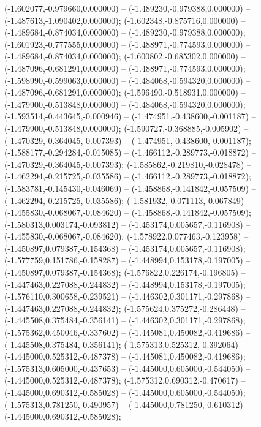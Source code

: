  (-1.602077,-0.979660,0.000000) -- (-1.489230,-0.979388,0.000000) -- (-1.487613,-1.090402,0.000000);
 (-1.602348,-0.875716,0.000000) -- (-1.489684,-0.874034,0.000000) -- (-1.489230,-0.979388,0.000000);
 (-1.601923,-0.777555,0.000000) -- (-1.488971,-0.774593,0.000000) -- (-1.489684,-0.874034,0.000000);
 (-1.600802,-0.685302,0.000000) -- (-1.487096,-0.681291,0.000000) -- (-1.488971,-0.774593,0.000000);
 (-1.598990,-0.599063,0.000000) -- (-1.484068,-0.594320,0.000000) -- (-1.487096,-0.681291,0.000000);
 (-1.596490,-0.518931,0.000000) -- (-1.479900,-0.513848,0.000000) -- (-1.484068,-0.594320,0.000000);
 (-1.593514,-0.443645,-0.000946) -- (-1.474951,-0.438600,-0.001187) -- (-1.479900,-0.513848,0.000000);
 (-1.590727,-0.368885,-0.005902) -- (-1.470329,-0.364045,-0.007393) -- (-1.474951,-0.438600,-0.001187);
 (-1.588177,-0.294284,-0.015085) -- (-1.466112,-0.289773,-0.018872) -- (-1.470329,-0.364045,-0.007393);
 (-1.585862,-0.219810,-0.028478) -- (-1.462294,-0.215725,-0.035586) -- (-1.466112,-0.289773,-0.018872);
 (-1.583781,-0.145430,-0.046069) -- (-1.458868,-0.141842,-0.057509) -- (-1.462294,-0.215725,-0.035586);
 (-1.581932,-0.071113,-0.067849) -- (-1.455830,-0.068067,-0.084620) -- (-1.458868,-0.141842,-0.057509);
 (-1.580313,0.003174,-0.093812) -- (-1.453174,0.005657,-0.116908) -- (-1.455830,-0.068067,-0.084620);
 (-1.578922,0.077463,-0.123958) -- (-1.450897,0.079387,-0.154368) -- (-1.453174,0.005657,-0.116908);
 (-1.577759,0.151786,-0.158287) -- (-1.448994,0.153178,-0.197005) -- (-1.450897,0.079387,-0.154368);
 (-1.576822,0.226174,-0.196805) -- (-1.447463,0.227088,-0.244832) -- (-1.448994,0.153178,-0.197005);
 (-1.576110,0.300658,-0.239521) -- (-1.446302,0.301171,-0.297868) -- (-1.447463,0.227088,-0.244832);
 (-1.575624,0.375272,-0.286448) -- (-1.445508,0.375484,-0.356141) -- (-1.446302,0.301171,-0.297868);
 (-1.575362,0.450046,-0.337602) -- (-1.445081,0.450082,-0.419686) -- (-1.445508,0.375484,-0.356141);
 (-1.575313,0.525312,-0.392064) -- (-1.445000,0.525312,-0.487378) -- (-1.445081,0.450082,-0.419686);
 (-1.575313,0.605000,-0.437653) -- (-1.445000,0.605000,-0.544050) -- (-1.445000,0.525312,-0.487378);
 (-1.575312,0.690312,-0.470617) -- (-1.445000,0.690312,-0.585028) -- (-1.445000,0.605000,-0.544050);
 (-1.575313,0.781250,-0.490957) -- (-1.445000,0.781250,-0.610312) -- (-1.445000,0.690312,-0.585028);
